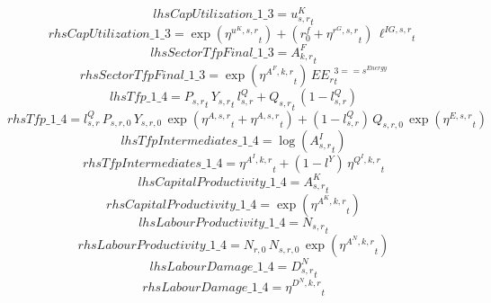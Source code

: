 \begin{dmath*}
lhsCapUtilization\_1\_3 = {{u^K_{s,r}}}_{t}
\end{dmath*}
\begin{dmath*}
rhsCapUtilization\_1\_3 = \exp\left({{\eta^{u^K,s,r}}}_{t}\right)+\left({{r^f_0}}+{{\eta^{r^G,s,r}}}_{t}\right)\, {{\ell^{IG,s,r}}}_{t}
\end{dmath*}
\begin{dmath*}
lhsSectorTfpFinal\_1\_3 = {{A^{F}_{k,r}}}_{t}
\end{dmath*}
\begin{dmath*}
rhsSectorTfpFinal\_1\_3 = \exp\left({{\eta^{A^F,k,r}}}_{t}\right)\, {{EE_r}}_{t}^{3=={{s^{Energy}}}}
\end{dmath*}
\begin{dmath*}
lhsTfp\_1\_4 = {{P_{s,r}}}_{t}\, {{Y_{s,r}}}_{t}\, {{l^{Q}_{s,r}}}+{{Q_{s,r}}}_{t}\, \left(1-{{l^{Q}_{s,r}}}\right)
\end{dmath*}
\begin{dmath*}
rhsTfp\_1\_4 = {{l^{Q}_{s,r}}}\, {{P_{s,r,0}}}\, {{Y_{s,r,0}}}\, \exp\left({{\eta^{A,s,r}}}_{t}+{{\eta^{A,s,r}}}_{t}\right)+\left(1-{{l^{Q}_{s,r}}}\right)\, {{Q_{s,r,0}}}\, \exp\left({{\eta^{E,s,r}}}_{t}\right)
\end{dmath*}
\begin{dmath*}
lhsTfpIntermediates\_1\_4 = \log\left({{A^{I}_{s,r}}}_{t}\right)
\end{dmath*}
\begin{dmath*}
rhsTfpIntermediates\_1\_4 = {{\eta^{A^{I},k,r}}}_{t}+\left(1-{{l^{Y}}}\right)\, {{\eta^{Q^{I},k,r}}}_{t}
\end{dmath*}
\begin{dmath*}
lhsCapitalProductivity\_1\_4 = {{A^{K}_{s,r}}}_{t}
\end{dmath*}
\begin{dmath*}
rhsCapitalProductivity\_1\_4 = \exp\left({{\eta^{A^{K},k,r}}}_{t}\right)
\end{dmath*}
\begin{dmath*}
lhsLabourProductivity\_1\_4 = {{N_{s,r}}}_{t}
\end{dmath*}
\begin{dmath*}
rhsLabourProductivity\_1\_4 = {{N_{r,0}}}\, {{N_{s,r,0}}}\, \exp\left({{\eta^{A^{N},k,r}}}_{t}\right)
\end{dmath*}
\begin{dmath*}
lhsLabourDamage\_1\_4 = {{D^N_{s,r}}}_{t}
\end{dmath*}
\begin{dmath*}
rhsLabourDamage\_1\_4 = {{\eta^{D^{N},k,r}}}_{t}
\end{dmath*}
